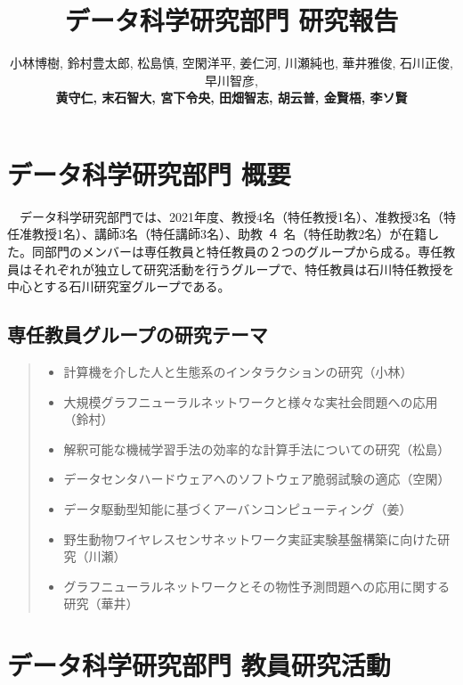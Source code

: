 \documentclass[11pt]{jarticle}
\title{データ科学研究部門 研究報告}
\author{小林博樹, 鈴村豊太郎, 松島慎, 空閑洋平, 姜仁河, 川瀬純也, 華井雅俊, 石川正俊, 早川智彦, \\
\textbf{黄守仁, 末石智大, 宮下令央, 田畑智志, 胡云普, 金賢梧, 李ソ賢}}
\begin{document}
\maketitle

\section{データ科学研究部門 概要}
　データ科学研究部門では、2021年度、教授4名（特任教授1名）、准教授3名（特任准教授1名）、講師3名（特任講師3名）、助教 ４ 名（特任助教2名）が在籍した。同部門のメンバーは専任教員と特任教員の２つのグループから成る。専任教員はそれぞれが独立して研究活動を行うグループで、特任教員は石川特任教授を中心とする石川研究室グループである。 


\subsection{専任教員グループの研究テーマ}

\begin{quote}
\begin{itemize}
\item 計算機を介した人と生態系のインタラクションの研究（小林）
\item 大規模グラフニューラルネットワークと様々な実社会問題への応用（鈴村）
\item 解釈可能な機械学習手法の効率的な計算手法についての研究（松島）
\item データセンタハードウェアへのソフトウェア脆弱試験の適応（空閑）
\item データ駆動型知能に基づくアーバンコンピューティング（姜）
\item 野生動物ワイヤレスセンサネットワーク実証実験基盤構築に向けた研究（川瀬）
\item グラフニューラルネットワークとその物性予測問題への応用に関する研究（華井）
\end{itemize}
\end{quote}



\section{データ科学研究部門 教員研究活動}
\end{document}
